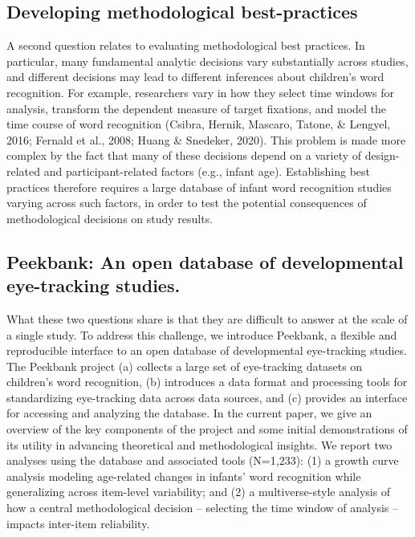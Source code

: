 \documentclass[
  english,
  man,floatsintext]{apa6}
\begin{document}
\hypertarget{developing-methodological-best-practices}{%
\subsection{Developing methodological best-practices}\label{developing-methodological-best-practices}}

A second question relates to evaluating methodological best practices.
In particular, many fundamental analytic decisions vary substantially across studies, and different decisions may lead to different inferences about children's word recognition.
For example, researchers vary in how they select time windows for analysis, transform the dependent measure of target fixations, and model the time course of word recognition (Csibra, Hernik, Mascaro, Tatone, \& Lengyel, 2016; Fernald et al., 2008; Huang \& Snedeker, 2020).
This problem is made more complex by the fact that many of these decisions depend on a variety of design-related and participant-related factors (e.g., infant age).
Establishing best practices therefore requires a large database of infant word recognition studies varying across such factors, in order to test the potential consequences of methodological decisions on study results.

\hypertarget{peekbank-an-open-database-of-developmental-eye-tracking-studies.}{%
\subsection{Peekbank: An open database of developmental eye-tracking studies.}\label{peekbank-an-open-database-of-developmental-eye-tracking-studies.}}

What these two questions share is that they are difficult to answer at the scale of a single study.
To address this challenge, we introduce Peekbank, a flexible and reproducible interface to an open database of developmental eye-tracking studies.
The Peekbank project (a) collects a large set of eye-tracking datasets on children's word recognition, (b) introduces a data format and processing tools for standardizing eye-tracking data across data sources, and (c) provides an interface for accessing and analyzing the database.
In the current paper, we give an overview of the key components of the project and some initial demonstrations of its utility in advancing theoretical and methodological insights.
We report two analyses using the database and associated tools (N=1,233): (1) a growth curve analysis modeling age-related changes in infants' word recognition while generalizing across item-level variability; and (2) a multiverse-style analysis of how a central methodological decision -- selecting the time window of analysis -- impacts inter-item reliability.
\end{document}
